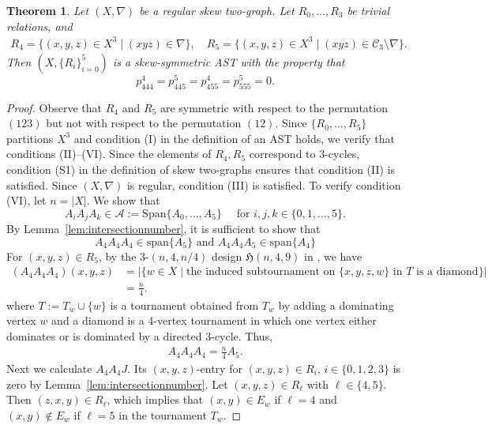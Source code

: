 \documentclass[11pt,oneside]{amsart}
\newtheorem{theorem}{Theorem}[section]
\begin{document}
{\begin{theorem}\label{thm:astrst}
    Let $(X,\nabla)$ be a regular skew two-graph. Let $R_0,\ldots,R_3$ be trivial relations, and 
    \begin{align*}%
    R_4=\{(x,y,z)\in X^3\mid (xyz) \in \nabla\},\quad R_5=\{(x,y,z)\in X^3\mid (xyz) \in \mathcal C_3\setminus \nabla\}. 
\end{align*}
    Then  $(X,\{R_i\}_{i=0}^5)$  is a skew-symmetric AST with the property that 
    \[p_{444}^4=p_{445}^5=p_{455}^4=p_{555}^5=0.\]  
\end{theorem}
\begin{proof}
    Observe that  $R_4$ and $R_5$ are symmetric with respect to the permutation $(123)$ but not  with respect to the permutation $(12)$.   Since  $\{R_0,\ldots,R_5\}$ partitions $X^3$ and condition (I) in the definition of an AST holds, we  verify that conditions (II)--(VI). 
    Since the elements of $R_4, R_5$ correspond to 3-cycles, condition (S1) in the definition of skew two-graphs ensures that condition (II) is satisfied.
    Since  $(X,\nabla)$ is regular, condition (III)  is satisfied. To verify condition (VI),  let $n=|X|$. We show that 
    \[
    A_iA_jA_k\in\mathcal{A}:=\text{Span}\{A_0,\ldots,A_5\} \quad \mbox{ for }i,j,k\in\{0,1,\ldots,5\}.
    \]
    By Lemma~\ref{lem:intersectionnumber}, it is sufficient to show that 
    \[
    A_4A_4A_4\in \text{span}\{A_5\} \text{ and }A_4A_4A_5\in \text{span}\{A_4\}
    \]
    For $(x,y,z)\in R_5$, by the $3$-$(n,4,n/4)$ design $\mathfrak{H}(n,4,9)$ in \cite[Example~2.4]{greaves2024constructions}, we have 
    \begin{align*}
(A_4A_4A_4)(x,y,z)
&= \left|\{w\in X \mid \text{the induced subtournament on }\{x,y,z,w\}\text{ in }T\text{ is a diamond}\}\right| \\
&= \frac{n}{4}.
\end{align*}
where $ T:=T_w \cup\{w\}$ is a tournament obtained from $T_w$ by adding a dominating vertex $w$ and a diamond is a 4-vertex tournament in which one vertex either dominates or is dominated by a directed 3-cycle. Thus, 
    \begin{align}\label{eq:444}     
    A_4A_4A_4=\frac{n}{4} A_5. 
    \end{align}
    Next we calculate $A_4A_4J$. Its $(x,y,z)$-entry for $(x,y,z)\in R_i$, $i\in\{0,1,2,3\}$ is zero by Lemma~\ref{lem:intersectionnumber}. Let $(x,y,z)\in R_\ell$ with $\ell \in\{4,5\}$. 
    Then $(z,x,y)\in R_\ell$, which implies that $(x,y)\in E_w$ if $\ell=4$ and $(x,y)\not\in E_w$ if $\ell=5$ in the tournament $T_w$. 

\end{proof}}
\end{document}
